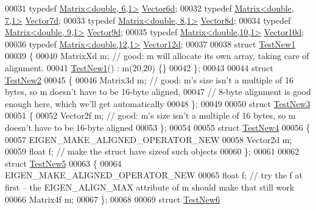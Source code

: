 \begin{DoxyCode}
00031 \textcolor{keyword}{typedef} \hyperlink{group___core___module_class_eigen_1_1_matrix}{Matrix<double, 6,1>} \hyperlink{group___core___module_class_eigen_1_1_matrix}{Vector6d};
00032 \textcolor{keyword}{typedef} \hyperlink{group___core___module_class_eigen_1_1_matrix}{Matrix<double, 7,1>} \hyperlink{group___core___module_class_eigen_1_1_matrix}{Vector7d};
00033 \textcolor{keyword}{typedef} \hyperlink{group___core___module_class_eigen_1_1_matrix}{Matrix<double, 8,1>} \hyperlink{group___core___module_class_eigen_1_1_matrix}{Vector8d};
00034 \textcolor{keyword}{typedef} \hyperlink{group___core___module_class_eigen_1_1_matrix}{Matrix<double, 9,1>} \hyperlink{group___core___module_class_eigen_1_1_matrix}{Vector9d};
00035 \textcolor{keyword}{typedef} \hyperlink{group___core___module_class_eigen_1_1_matrix}{Matrix<double,10,1>} \hyperlink{group___core___module_class_eigen_1_1_matrix}{Vector10d};
00036 \textcolor{keyword}{typedef} \hyperlink{group___core___module_class_eigen_1_1_matrix}{Matrix<double,12,1>} \hyperlink{group___core___module_class_eigen_1_1_matrix}{Vector12d};
00037 
00038 \textcolor{keyword}{struct }\hyperlink{struct_test_new1}{TestNew1}
00039 \{
00040   MatrixXd m; \textcolor{comment}{// good: m will allocate its own array, taking care of alignment.}
00041   \hyperlink{struct_test_new1}{TestNew1}() : m(20,20) \{\}
00042 \};
00043 
00044 \textcolor{keyword}{struct }\hyperlink{struct_test_new2}{TestNew2}
00045 \{
00046   Matrix3d m; \textcolor{comment}{// good: m's size isn't a multiple of 16 bytes, so m doesn't have to be 16-byte aligned,}
00047               \textcolor{comment}{// 8-byte alignment is good enough here, which we'll get automatically}
00048 \};
00049 
00050 \textcolor{keyword}{struct }\hyperlink{struct_test_new3}{TestNew3}
00051 \{
00052   Vector2f m; \textcolor{comment}{// good: m's size isn't a multiple of 16 bytes, so m doesn't have to be 16-byte aligned}
00053 \};
00054 
00055 \textcolor{keyword}{struct }\hyperlink{struct_test_new4}{TestNew4}
00056 \{
00057   EIGEN\_MAKE\_ALIGNED\_OPERATOR\_NEW
00058   Vector2d m;
00059   \textcolor{keywordtype}{float} f; \textcolor{comment}{// make the struct have sizeof%
       such objects}
00060 \};
00061 
00062 \textcolor{keyword}{struct }\hyperlink{struct_test_new5}{TestNew5}
00063 \{
00064   EIGEN\_MAKE\_ALIGNED\_OPERATOR\_NEW
00065   \textcolor{keywordtype}{float} f; \textcolor{comment}{// try the f at first -- the EIGEN\_ALIGN\_MAX attribute of m should make that still work}
00066   Matrix4f m;
00067 \};
00068 
00069 \textcolor{keyword}{struct }\hyperlink{struct_test_new6}{TestNew6}

\end{DoxyCode}
